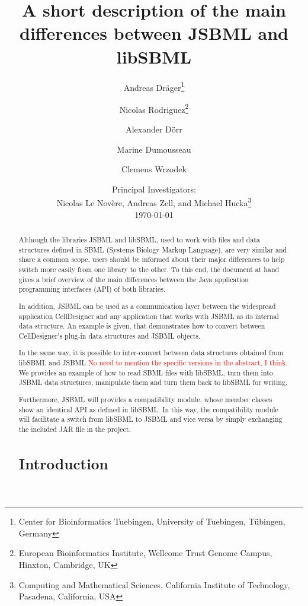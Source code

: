 \documentclass[
  BCOR12mm,
  letterpaper,
  11pt,
  headsepline,
  pointlessnumbers,
  tablecaptionabove,
  onelinecaption,
  headinclude,
  appendixprefix,
  idxtotoc,
  bibtotoc,
  twoside,
  titlepage
]{scrartcl}
\title{A short description of the main differences between JSBML and libSBML}
\author{Andreas Dr\"ager\thanks{Center for Bioinformatics Tuebingen, University
of Tuebingen, T\"ubingen, Germany}\and%
Nicolas Rodriguez\thanks{European Bioinformatics Institute, Wellcome Trust
Genome Campus, Hinxton, Cambridge, UK}\and%
Alexander D\"orr\footnotemark[1]\and%
Marine Dumousseau\footnotemark[2]\and%
Clemens Wrzodek\footnotemark[1]}
\date{Principal Investigators:\\
Nicolas Le Nov{\`e}re\footnotemark[2], Andreas Zell\footnotemark[1], and Michael
Hucka\thanks{Computing and Mathematical Sciences, California Institute of
Technology, Pasadena, California, USA}\\[4ex]
\today}
\begin{document}
\maketitle

\begin{abstract}
Although the libraries JSBML and libSBML, used to work with files and data
structures defined in SBML (Systems Biology Markup Language), are
very similar and share a common scope, users should be informed about their
major differences to help switch more easily from one library to the other. To
this end, the document at hand gives a brief overview of the main differences
between the Java\texttrademark{} application programming interfaces (API) of
both libraries.

In addition, JSBML can be used as a communication layer between the widespread
application CellDesigner and any application that works with JSBML as its
internal data structure. An example is given, that demonstrates how to
convert between CellDesigner's plug-in data structures and JSBML objects.

In the same way, it is possible to inter-convert between data structures
obtained from libSBML and JSBML \textcolor{red}{No need to mention the
specific versions in the abstract, I think}. We provides an example of how to
read SBML files with libSBML, turn them into JSBML data structures, manipulate
 them and turn them back to libSBML for writing.

Furthermore, JSBML will provides a compatibility module, whose member classes
show an identical API as defined in libSBML. In this way, the
compatibility module will facilitate a switch from libSBML to JSBML and vice
versa by simply exchanging the included JAR file in the project.



\tableofcontents

\section{Introduction}


\end{abstract}
\end{document}
